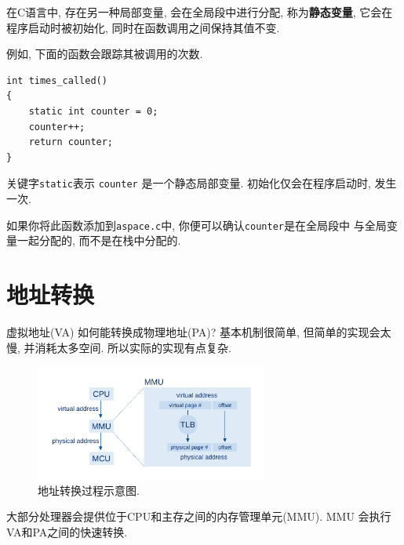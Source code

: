 \documentclass[12pt]{book}
\begin{document}
{在C语言中, 存在另一种局部变量, 会在全局段中进行分配, 称为{\bf 静态变量},
它会在程序启动时被初始化, 同时在函数调用之间保持其值不变.

例如, 下面的函数会跟踪其被调用的次数.

\begin{verbatim}
int times_called()
{
    static int counter = 0;
    counter++;
    return counter;
}
\end{verbatim}
%
关键字{\tt static}表示 {\tt counter} 是一个静态局部变量.
初始化仅会在程序启动时, 发生一次.

如果你将此函数添加到{\tt aspace.c}中, 你便可以确认{\tt counter}是在全局段中
与全局变量一起分配的, 而不是在栈中分配的.


\section{地址转换}
\label{address_translation}

虚拟地址(VA) 如何能转换成物理地址(PA)?
基本机制很简单, 但简单的实现会太慢, 并消耗太多空间.
所以实际的实现有点复杂.

\begin{figure}
\centerline{\includegraphics[width=3in]{figs/address_translation.pdf}}
\caption{地址转换过程示意图.}
\label{addtrans}
\end{figure}
大部分处理器会提供位于CPU和主存之间的内存管理单元(MMU).
MMU 会执行VA和PA之间的快速转换.

}
\end{document}
